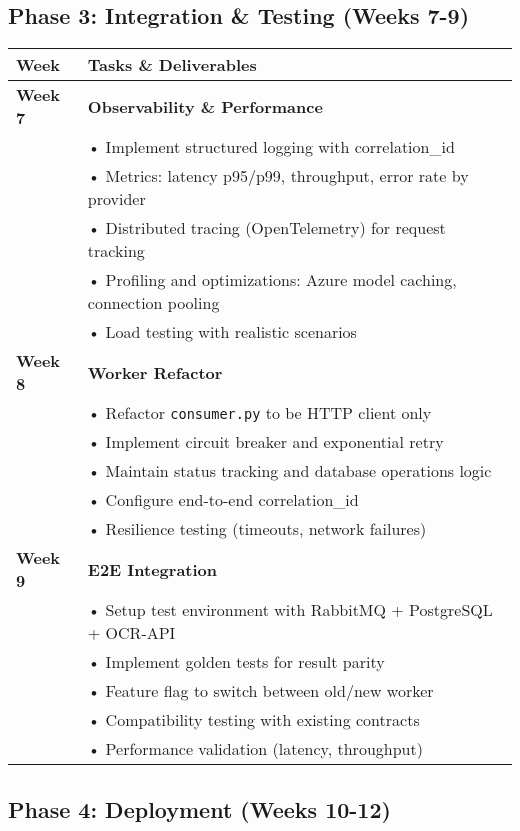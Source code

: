 \documentclass[11pt,a4paper]{article}
\begin{document}
\subsection{Phase 3: Integration \& Testing (Weeks 7-9)}

\begin{longtable}{|p{2cm}|p{12cm}|}
\hline
\rowcolor{phase3!30}
\textbf{Week} & \textbf{Tasks \& Deliverables} \\
\hline
\endhead

\textbf{Week 7} & 
\textbf{Observability \& Performance} \\
& • Implement structured logging with correlation\_id \\
& • Metrics: latency p95/p99, throughput, error rate by provider \\
& • Distributed tracing (OpenTelemetry) for request tracking \\
& • Profiling and optimizations: Azure model caching, connection pooling \\
& • Load testing with realistic scenarios \\
\hline

\textbf{Week 8} & 
\textbf{Worker Refactor} \\
& • Refactor \texttt{consumer.py} to be HTTP client only \\
& • Implement circuit breaker and exponential retry \\
& • Maintain status tracking and database operations logic \\
& • Configure end-to-end correlation\_id \\
& • Resilience testing (timeouts, network failures) \\
\hline

\textbf{Week 9} & 
\textbf{E2E Integration} \\
& • Setup test environment with RabbitMQ + PostgreSQL + OCR-API \\
& • Implement golden tests for result parity \\
& • Feature flag to switch between old/new worker \\
& • Compatibility testing with existing contracts \\
& • Performance validation (latency, throughput) \\
\hline
\end{longtable}

\subsection{Phase 4: Deployment (Weeks 10-12)}
\end{document}
